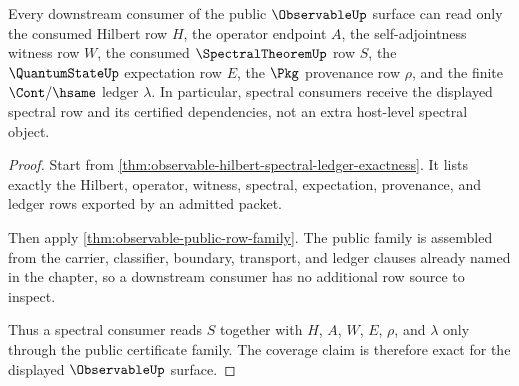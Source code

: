\begin{theorem}
\label{thm:observable-spectral-row-consumer-coverage}
Every downstream consumer of the public $\ObservableUp$ surface can read only
the consumed Hilbert row $H$, the operator endpoint $A$, the self-adjointness
witness row $W$, the consumed $\SpectralTheoremUp$ row $S$, the
$\QuantumStateUp$ expectation row $E$, the $\Pkg$ provenance row $\rho$, and
the finite $\Cont/\hsame$ ledger $\lambda$. In particular, spectral consumers
receive the displayed spectral row and its certified dependencies, not an
extra host-level spectral object.
\end{theorem}
\begin{proof}
Start from \autoref{thm:observable-hilbert-spectral-ledger-exactness}. It
lists exactly the Hilbert, operator, witness, spectral, expectation,
provenance, and ledger rows exported by an admitted packet.

Then apply \autoref{thm:observable-public-row-family}. The public family is
assembled from the carrier, classifier, boundary, transport, and ledger
clauses already named in the chapter, so a downstream consumer has no
additional row source to inspect.

Thus a spectral consumer reads $S$ together with $H$, $A$, $W$, $E$, $\rho$,
and $\lambda$ only through the public certificate family. The coverage claim is
therefore exact for the displayed $\ObservableUp$ surface.
\end{proof}

